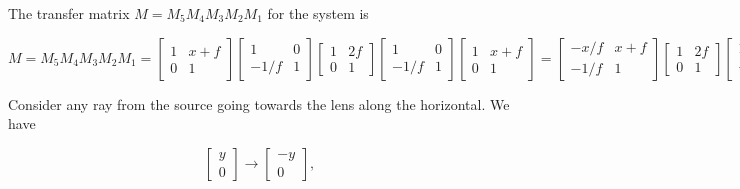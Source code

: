 {\begin{enumerate}

The transfer matrix \(M = M_5 M_4 M_3 M_2 M_1\) for the system is

\begin{dmath}\label{eqn:modernOpticsProblemSet1P1:1670}
M
= M_5 M_4 M_3 M_2 M_1
=
\begin{bmatrix}
1 & x + f \\
0 & 1
\end{bmatrix}
\begin{bmatrix}
1 & 0 \\
-1/f & 1
\end{bmatrix}
\begin{bmatrix}
1 & 2 f \\
0 & 1
\end{bmatrix}
\begin{bmatrix}
1 & 0 \\
-1/f & 1
\end{bmatrix}
\begin{bmatrix}
1 & x + f \\
0 & 1
\end{bmatrix}
=
\begin{bmatrix}
-x/f & x + f \\
-1/f & 1
\end{bmatrix}
\begin{bmatrix}
1 & 2 f \\
0 & 1
\end{bmatrix}
\begin{bmatrix}
1 & x + f \\
-1/f & -x/f
\end{bmatrix}
=
\begin{bmatrix}
-x/f & -x + f \\
-1/f & -1
\end{bmatrix}
\begin{bmatrix}
1 & x + f \\
-1/f & -x/f
\end{bmatrix}
=
\begin{bmatrix}
-1 & -2 x \\
0 & -1
\end{bmatrix}.
\end{dmath}

Consider any ray from the source going towards the lens along the horizontal.  We have

\begin{dmath}\label{eqn:modernOpticsProblemSet1P1:1690}
\begin{bmatrix}
y \\
0
\end{bmatrix}
\rightarrow
\begin{bmatrix}
-y \\
0
\end{bmatrix},
\end{dmath}


\end{enumerate}}
